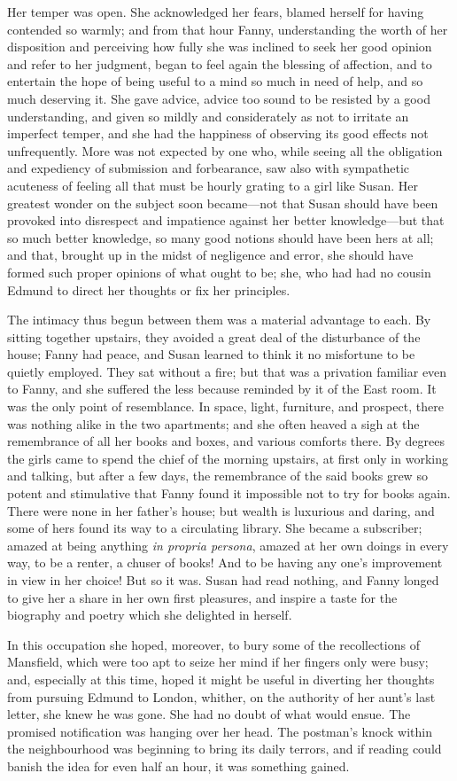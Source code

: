 Her temper was open. She acknowledged her fears, blamed herself for having contended so warmly; and from that hour Fanny, understanding the worth of her disposition and perceiving how fully she was inclined to seek her good opinion and refer to her judgment, began to feel again the blessing of affection, and to entertain the hope of being useful to a mind so much in need of help, and so much deserving it. She gave advice, advice too sound to be resisted by a good understanding, and given so mildly and considerately as not to irritate an imperfect temper, and she had the happiness of observing its good effects not unfrequently. More was not expected by one who, while seeing all the obligation and expediency of submission and forbearance, saw also with sympathetic acuteness of feeling all that must be hourly grating to a girl like Susan. Her greatest wonder on the subject soon became—not that Susan should have been provoked into disrespect and impatience against her better knowledge—but that so much better knowledge, so many good notions should have been hers at all; and that, brought up in the midst of negligence and error, she should have formed such proper opinions of what ought to be; she, who had had no cousin Edmund to direct her thoughts or fix her principles.

The intimacy thus begun between them was a material advantage to each. By sitting together upstairs, they avoided a great deal of the disturbance of the house; Fanny had peace, and Susan learned to think it no misfortune to be quietly employed. They sat without a fire; but that was a privation familiar even to Fanny, and she suffered the less because reminded by it of the East room. It was the only point of resemblance. In space, light, furniture, and prospect, there was nothing alike in the two apartments; and she often heaved a sigh at the remembrance of all her books and boxes, and various comforts there. By degrees the girls came to spend the chief of the morning upstairs, at first only in working and talking, but after a few days, the remembrance of the said books grew so potent and stimulative that Fanny found it impossible not to try for books again. There were none in her father's house; but wealth is luxurious and daring, and some of hers found its way to a circulating library. She became a subscriber; amazed at being anything \textit{in propria persona}, amazed at her own doings in every way, to be a renter, a chuser of books! And to be having any one's improvement in view in her choice! But so it was. Susan had read nothing, and Fanny longed to give her a share in her own first pleasures, and inspire a taste for the biography and poetry which she delighted in herself.

In this occupation she hoped, moreover, to bury some of the recollections of Mansfield, which were too apt to seize her mind if her fingers only were busy; and, especially at this time, hoped it might be useful in diverting her thoughts from pursuing Edmund to London, whither, on the authority of her aunt's last letter, she knew he was gone. She had no doubt of what would ensue. The promised notification was hanging over her head. The postman's knock within the neighbourhood was beginning to bring its daily terrors, and if reading could banish the idea for even half an hour, it was something gained. 